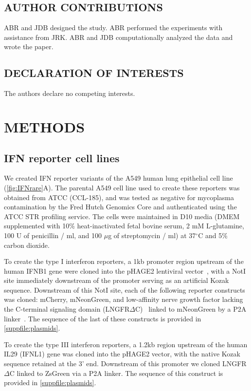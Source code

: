 \documentclass[10pt,letterpaper]{article}
\newcommand{\FIG}[1]{\autoref{fig:#1}}
\newcommand{\SUPPFILE}[1]{\autoref{suppfile:#1}}
\begin{document}
\subsection*{AUTHOR CONTRIBUTIONS}
ABR and JDB designed the study.
ABR performed the experiments with assistance from JRK.
ABR and JDB computationally analyzed the data and wrote the paper.

\subsection*{DECLARATION OF INTERESTS}
The authors declare no competing interests.



\section*{METHODS}

\subsection*{IFN reporter cell lines}
We created IFN reporter variants of the A549 human lung epithelial cell line (\FIG{IFNrare}A).
The parental A549 cell line used to create these reporters was obtained from ATCC (CCL-185), and was tested as negative for mycoplasma contamination by the Fred Hutch Genomics Core and authenticated using the ATCC STR profiling service.
The cells were maintained in D10 media (DMEM supplemented with 10\% heat-inactivated fetal bovine serum, 2 mM L-glutamine, 100 U of penicillin / ml, and 100 $\mu$g of streptomycin / ml) at 37$^{\circ}$C and 5\% carbon dioxide.

To create the type I interferon reporters, a 1kb promoter region upstream of the human IFNB1 gene were cloned into the pHAGE2 lentiviral vector~\citep{oconnell2010lentiviral}, with a NotI site immediately downstream of the promoter serving as an artificial Kozak sequence. 
Downstream of this NotI site, each of the following reporter constructs was cloned: mCherry, mNeonGreen, and low-affinity nerve growth factor lacking the C-terminal signaling domain (LNGFR$\Delta$C)~\citep{bonini1997hsv,ruggieri1997cell} linked to mNeonGreen by a P2A linker~\citep{kim2011high}.
The sequence of the last of these constructs is provided in \SUPPFILE{plasmids}.

To create the type III interferon reporters, a 1.2kb region upstream of the human IL29 (IFNL1) gene was cloned into the pHAGE2 vector, with the native Kozak sequence retained at the 3' end. 
Downstream of this promoter we cloned LNGFR$\Delta$C linked to ZsGreen via a P2A linker.
The sequence of this construct is provided in \SUPPFILE{plasmids}.
 
\end{document}
